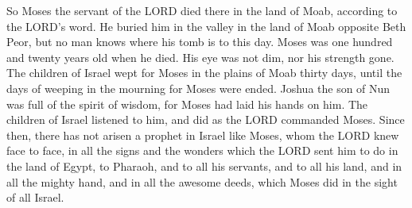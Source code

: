  So Moses the servant of the LORD died there in the land
of Moab, according to the LORD's word.  He buried him in
the valley in the land of Moab opposite Beth Peor, but no man knows
where his tomb is to this day.  Moses was one hundred and
twenty years old when he died. His eye was not dim, nor his strength
gone.  The children of Israel wept for Moses in the plains
of Moab thirty days, until the days of weeping in the mourning for Moses
were ended.  Joshua the son of Nun was full of the spirit
of wisdom, for Moses had laid his hands on him. The children of Israel
listened to him, and did as the LORD commanded Moses. 
Since then, there has not arisen a prophet in Israel like Moses, whom
the LORD knew face to face,  in all the signs and the
wonders which the LORD sent him to do in the land of Egypt, to Pharaoh,
and to all his servants, and to all his land,  and in all
the mighty hand, and in all the awesome deeds, which Moses did in the
sight of all Israel.
